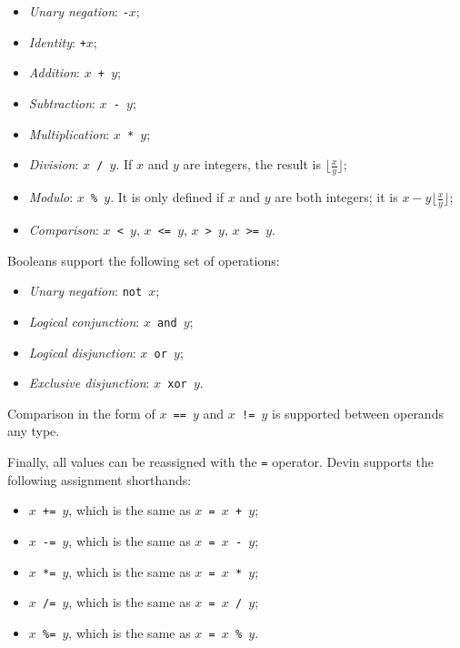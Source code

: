\documentclass[11pt, american, draft]{PhdThesis}
\begin{document}
  \begin{itemize}[noitemsep,topsep=0pt]
    \item \emph{Unary negation}: \mbox{\texttt{-$x$}};

    \item \emph{Identity}: \mbox{\texttt{+$x$}};

    \item \emph{Addition}: \mbox{\texttt{$x$ + $y$}};

    \item \emph{Subtraction}: \mbox{\texttt{$x$ - $y$}};

    \item \emph{Multiplication}: \mbox{\texttt{$x$ * $y$}};

    \item \emph{Division}: \mbox{\texttt{$x$ / $y$}}. If $x$ and $y$ are integers, the result is
          \mbox{$\lfloor\frac{x}{y}\rfloor$};

    \item \emph{Modulo}: \mbox{\texttt{$x$ \% $y$}}. It is only defined if $x$ and $y$ are both
          integers; it is \mbox{$x - y \lfloor\frac{x}{y}\rfloor$};

    \item \emph{Comparison}: \mbox{\texttt{$x$ < $y$}}, \mbox{\texttt{$x$ <= $y$}},
          \mbox{\texttt{$x$ > $y$}}, \mbox{\texttt{$x$ >= $y$}}.
  \end{itemize}

  Booleans support the following set of operations:

  \begin{itemize}[noitemsep,topsep=0pt]
    \item \emph{Unary negation}: \mbox{\texttt{not $x$}};
    \item \emph{Logical conjunction}: \mbox{\texttt{$x$ and $y$}};
    \item \emph{Logical disjunction}: \mbox{\texttt{$x$ or $y$}};
    \item \emph{Exclusive disjunction}: \mbox{\texttt{$x$ xor $y$}}.
  \end{itemize}

  Comparison in the form of \mbox{\texttt{$x$ == $y$}} and \mbox{\texttt{$x$ != $y$}} is supported
  between operands any type.
  
  Finally, all values can be reassigned with the \verb$=$ operator. Devin supports the following assignment
  shorthands:

  \begin{itemize}[noitemsep,topsep=0pt]
    \item \mbox{\texttt{$x$ += $y$}}, which is the same as \mbox{\texttt{$x$ = $x$ + $y$}};
    \item \mbox{\texttt{$x$ -= $y$}}, which is the same as \mbox{\texttt{$x$ = $x$ - $y$}};
    \item \mbox{\texttt{$x$ *= $y$}}, which is the same as \mbox{\texttt{$x$ = $x$ * $y$}};
    \item \mbox{\texttt{$x$ /= $y$}}, which is the same as \mbox{\texttt{$x$ = $x$ / $y$}};
    \item \mbox{\texttt{$x$ \%= $y$}}, which is the same as \mbox{\texttt{$x$ = $x$ \% $y$}}.
  \end{itemize}
\end{document}
